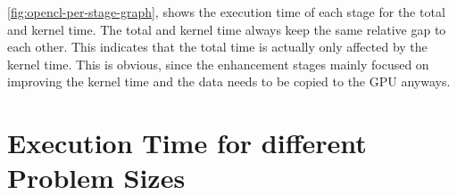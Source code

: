 \documentclass[final]{report}
\begin{document}
\cref{fig:opencl-per-stage-graph}, shows the execution time of each stage for the total and kernel time.
The total and kernel time always keep the same relative gap to each other.
This indicates that the total time is actually only affected by the kernel time.
This is obvious, since the enhancement stages mainly focused on improving the kernel time and the data needs to be copied to the GPU anyways.


\section{Execution Time for different Problem Sizes}
\end{document}
